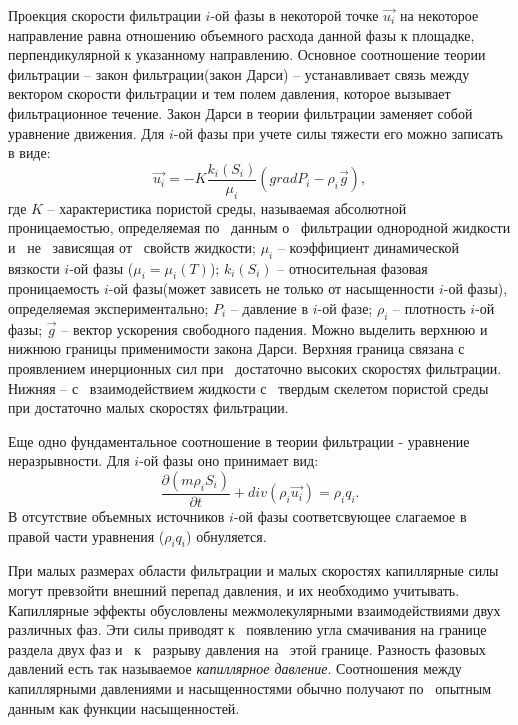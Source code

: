 Проекция скорости фильтрации $i$-ой фазы в некоторой точке
$\overrightarrow{u_i}$ на некоторое направление равна отношению объемного
расхода данной фазы к площадке, перпендикулярной к указанному направлению.
Основное соотношение теории фильтрации -- закон фильтрации(закон Дарси) -- устанавливает 
связь между вектором скорости фильтрации и тем полем давления, которое вызывает 
фильтрационное течение. Закон Дарси в теории фильтрации заменяет собой уравнение 
движения. Для $i$-ой фазы при учете силы тяжести его можно записать в виде:
\begin{equation}
\label{Darcy}
  \overrightarrow{u_i}=-K \frac{k_i(S_i)}{{\mu}_i}(grad P_i - {\rho}_i\overrightarrow{g}),
\end{equation}
где $K$ -- характеристика пористой среды, называемая
абсолютной проницаемостью, определяемая по~ данным о~ фильтрации однородной
жидкости и~ не~ зависящая от~ свойств жидкости; $\mu_i$ -- коэффициент динамической
вязкости $i$-ой фазы ($\mu_i=\mu_i(T)$); $k_i(S_i)$ -- относительная фазовая проницаемость $i$-ой фазы(может зависеть 
не только от насыщенности $i$-ой фазы), определяемая
экспериментально; $P_i$ -- давление в $i$-ой фазе; ${\rho}_i$ -- плотность $i$-ой фазы;
$\overrightarrow{g}$ -- вектор ускорения свободного падения.
Можно выделить верхнюю и нижнюю границы применимости закона Дарси\cite{Aziz-Settari}. Верхняя граница связана 
с~ проявлением инерционных сил при~ достаточно высоких скоростях фильтрации. Нижняя --
с~ взаимодействием жидкости с~ твердым скелетом пористой среды при достаточно малых 
скоростях фильтрации.

Еще одно фундаментальное соотношение в теории фильтрации - уравнение неразрывности. 
Для $i$-ой фазы оно принимает вид:
 \begin{equation}
 \label{mass}
 	 \frac{\partial (m \rho_i S_i)}{\partial t}+ div(\rho_i \overrightarrow{u_i}) = \rho_i q_i.
 \end{equation}
В отсутствие объемных источников $i$-ой фазы
соответсвующее слагаемое в правой части уравнения (${\rho_i}q_i$) обнуляется.

При малых размерах области фильтрации и малых скоростях капиллярные силы могут
превзойти внешний перепад давления, и их необходимо учитывать.
Капиллярные эффекты обусловлены межмолекулярными взаимодействиями двух различных
фаз. Эти силы приводят к~ появлению угла смачивания на границе раздела двух фаз и~
к~ разрыву давления на~ этой границе. Разность фазовых давлений есть так
называемое \textit{капиллярное давление}. Соотношения между капиллярными
давлениями и насыщенностями обычно получают по~ опытным данным как функции насыщенностей.

